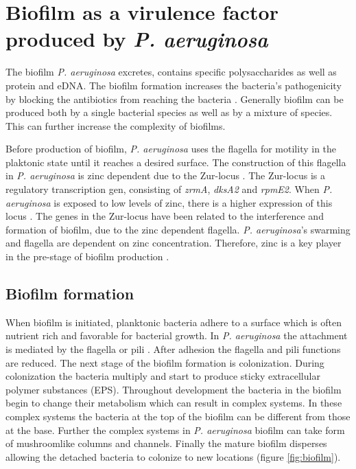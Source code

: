 \section{Biofilm as a virulence factor produced by \textit{P. aeruginosa}}

The biofilm \textit{P. aeruginosa} excretes, contains specific polysaccharides as well as protein and eDNA. The biofilm formation increases the bacteria's pathogenicity by blocking the antibiotics from reaching the bacteria \cite{Thi2020PseudomonasBiofilms}. Generally biofilm can be produced both by a single bacterial species as well as by a mixture of species. This can further increase the complexity of biofilms. 

Before production of biofilm, \textit{P. aeruginosa} uses the flagella for motility in the plaktonic state until it reaches a desired surface. The construction of this flagella in \textit{P. aeruginosa} is zinc dependent due to the Zur-locus \cite{Mastropasqua2018EfficientLung}. The Zur-locus is a regulatory transcription gen, consisting of \textit{zrmA}, \textit{dksA2} and \textit{rpmE2}. When \textit{P. aeruginosa} is exposed to low levels of zinc, there is a higher expression of this locus \cite{Mastropasqua2018EfficientLung}. The genes in the Zur-locus have been related to the interference and formation of biofilm, due to the zinc dependent flagella. \textit{P. aeruginosa}'s swarming and flagella are dependent on zinc concentration. Therefore, zinc is a key player in the pre-stage of biofilm production \cite{Mastropasqua2018EfficientLung}.

\subsection{Biofilm formation} 
\noindent When biofilm is initiated, planktonic bacteria adhere to a surface which is often nutrient rich and favorable for bacterial growth. In \textit{P. aeruginosa} the attachment is mediated by the flagella or pili \cite{Ma2009AssemblyMatrix}. After adhesion the flagella and pili functions are reduced. The next stage of the biofilm formation is colonization. 
During colonization the bacteria multiply and start to produce sticky extracellular polymer substances (EPS). Throughout development the bacteria in the biofilm begin to change their metabolism which can result in complex systems. In these complex systems the bacteria at the top of the biofilm can be different from those at the base. Further the complex systems in \textit{P. aeruginosa} biofilm can take form of mushroomlike columns and channels. Finally the mature biofilm disperses allowing the detached bacteria to colonize to new locations \cite{Ma2009AssemblyMatrix} (figure \ref{fig:biofilm}). \\

